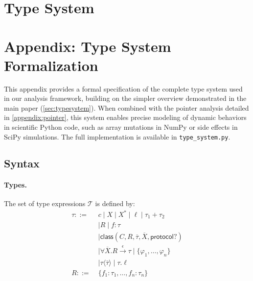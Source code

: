 \section{Type System}
\label{appendix:typesystem}
\section*{Appendix: Type System Formalization}
This appendix provides a formal specification of the complete type system used in our analysis framework, building on the simpler overview demonstrated in the main paper (\autoref{sec:typesystem}). When combined with the pointer analysis detailed in \autoref{appendix:pointer}, this system enables precise modeling of dynamic behaviors in scientific Python code, such as array mutations in NumPy or side effects in SciPy simulations. The full implementation is available in \texttt{type_system.py}.

\subsection{Syntax}

\paragraph{Types.} The set of type expressions $\mathcal{T}$ is defined by:
\[
\begin{aligned}
\tau ::= \;& c \mid X \mid X^* \mid \ell \mid \tau_1 + \tau_2 \\
&\mid R \mid f : \tau \\
&\mid \mathsf{class}(C, R, \overline{\tau}, \overline{X}, \mathsf{protocol}?) \\
&\mid \forall \overline{X}.R \xrightarrow{\epsilon} \tau \mid \{\varphi_1, \ldots, \varphi_n\} \\
&\mid \tau\langle\overline{\tau}\rangle \mid \tau.\ell \\
R ::= \;& \{f_1 : \tau_1, \ldots, f_n : \tau_n\}
\end{aligned}
\]

